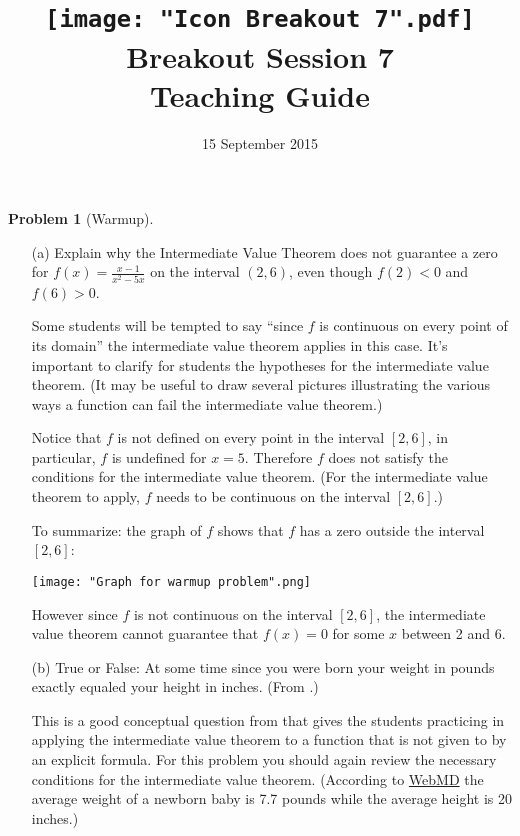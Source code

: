\documentclass{article}
\title{\texttt{[image: "Icon Breakout 7".pdf]}\\
  Breakout Session 7\\
  Teaching Guide
}
\date{15 September 2015}
\theoremstyle{definition}
\newtheorem{Problem}{Problem}
\begin{document}
\maketitle
\begin{Problem}[Warmup]
  \mbox{}
  \begin{itemize}
    \item[(a)]
      Explain why the Intermediate Value Theorem does not guarantee a zero for $f(x) = \frac{x-1}{x^2 - 5x}$ on the interval $(2,6)$, even though $f(2) < 0$ and $f(6) > 0$.
      \begin{Instructor Notes}  
        Some students will be tempted to say ``since $f$ is continuous on every point of its domain'' the intermediate value theorem applies in this case.
        It's important to clarify for students the hypotheses for the intermediate value theorem.
        (It may be useful to draw several pictures illustrating the various ways a function can fail the intermediate value theorem.)
      \end{Instructor Notes}

      \begin{Solution}
        Notice that $f$ is not defined on every point in the interval $[2, 6]$, in particular, $f$ is undefined for $x = 5$.
        Therefore $f$ does not satisfy the conditions for the intermediate value theorem.
        (For the intermediate value theorem to apply, $f$ needs to be continuous on the interval $[2,6]$.)

        To summarize: the graph of $f$ shows that $f$ has a zero outside the interval $[2, 6]$:
        \begin{center}
          \texttt{[image: "Graph for warmup problem".png]}
        \end{center}
        However since $f$ is not continuous on the interval $[2, 6]$, the intermediate value theorem cannot guarantee that $f(x) = 0$ for some $x$ between 2 and 6.
      \end{Solution}

    \item[(b)]
      True or False: At some time since you were born your weight in pounds exactly equaled your height in inches.
      (From \cite[Question 7]{terrell_goodquestions_2005}.)
      \begin{Instructor Notes}
        This is a good conceptual question from \cite[Question 7]{terrell_goodquestions_2005} that gives the students practicing in applying the intermediate value theorem to a function that is not given to by an explicit formula.
        For this problem you should again review the necessary conditions for the intermediate value theorem.
        (According to \href{http://www.webmd.boots.com/children/baby/guide/normal-baby-size-at-birth}{WebMD} the average weight of a newborn baby is 7.7 pounds while the average height is 20 inches.)
      \end{Instructor Notes}


\end{itemize}
\end{Problem}
\end{document}
